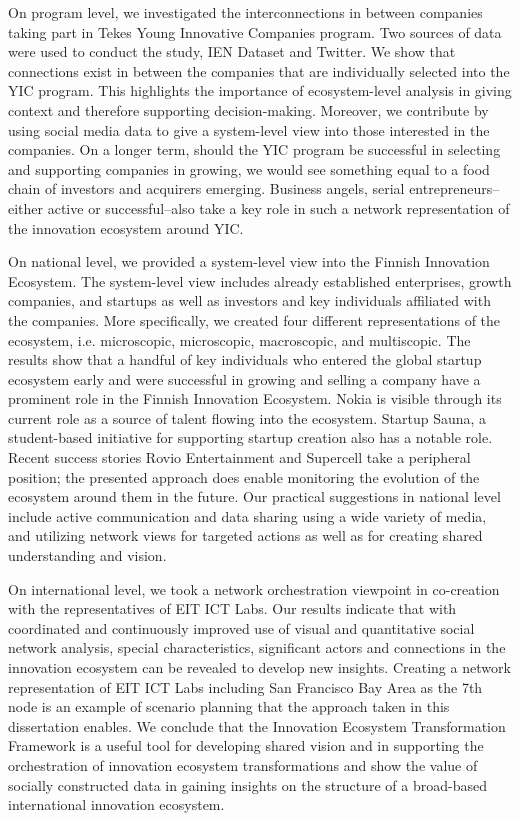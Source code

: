 On program level, we investigated the interconnections in between companies taking part in Tekes Young Innovative Companies program. Two sources of data were used to conduct the study, IEN Dataset and Twitter. We show that connections exist in between the companies that are individually selected into the YIC program. This highlights the importance of ecosystem-level analysis in giving context and therefore supporting decision-making. Moreover, we contribute by using social media data to give a system-level view into those interested in the companies. On a longer term, should the YIC program be successful in selecting and supporting companies in growing, we would see something equal to a food chain of investors and acquirers emerging. Business angels, serial entrepreneurs--either active or successful--also take a key role in such a network representation of the innovation ecosystem around YIC.

On national level, we provided a system-level view into the Finnish Innovation Ecosystem. The system-level view includes already established enterprises, growth companies, and startups as well as investors and key individuals affiliated with the companies. More specifically, we created four different representations of the ecosystem, i.e. microscopic, microscopic, macroscopic, and multiscopic. The results show that a handful of key individuals who entered the global startup ecosystem early and were successful in growing and selling a company have a prominent role in the Finnish Innovation Ecosystem. Nokia is visible through its current role as a source of talent flowing into the ecosystem. Startup Sauna, a student-based initiative for supporting startup creation also has a notable role. Recent success stories Rovio Entertainment and Supercell take a peripheral position; the presented approach does enable monitoring the evolution of the ecosystem around them in the future. Our practical suggestions in national level include active communication and data sharing using a wide variety of media, and utilizing network views for targeted actions as well as for creating shared understanding and vision.

On international level, we took a network orchestration viewpoint in co-creation with the representatives of EIT ICT Labs. Our results indicate that with coordinated and continuously improved use of visual and quantitative social network analysis, special characteristics, significant actors and connections in the innovation ecosystem can be revealed to develop new insights. Creating a network representation of EIT ICT Labs including San Francisco Bay Area as the 7th node is an example of scenario planning that the approach taken in this dissertation enables. We conclude that the Innovation Ecosystem Transformation Framework \citep{Russell2011TransformingOrchestration} is a useful tool for developing shared vision and in supporting the orchestration of innovation ecosystem transformations and show the value of socially constructed data in gaining insights on the structure of a broad-based international innovation ecosystem.

